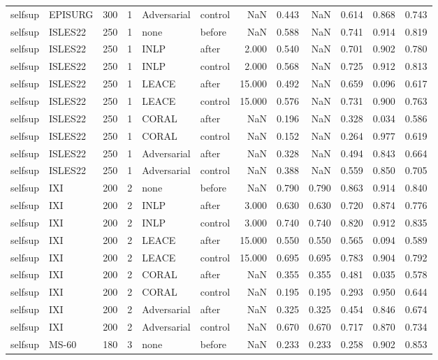 \begin{tabular}{llrrllrrrrrr}
selfsup & EPISURG & 300 & 1 & Adversarial & control & NaN & 0.443 & NaN & 0.614 & 0.868 & 0.743 \\
selfsup & ISLES22 & 250 & 1 & none & before & NaN & 0.588 & NaN & 0.741 & 0.914 & 0.819 \\
selfsup & ISLES22 & 250 & 1 & INLP & after & 2.000 & 0.540 & NaN & 0.701 & 0.902 & 0.780 \\
selfsup & ISLES22 & 250 & 1 & INLP & control & 2.000 & 0.568 & NaN & 0.725 & 0.912 & 0.813 \\
selfsup & ISLES22 & 250 & 1 & LEACE & after & 15.000 & 0.492 & NaN & 0.659 & 0.096 & 0.617 \\
selfsup & ISLES22 & 250 & 1 & LEACE & control & 15.000 & 0.576 & NaN & 0.731 & 0.900 & 0.763 \\
selfsup & ISLES22 & 250 & 1 & CORAL & after & NaN & 0.196 & NaN & 0.328 & 0.034 & 0.586 \\
selfsup & ISLES22 & 250 & 1 & CORAL & control & NaN & 0.152 & NaN & 0.264 & 0.977 & 0.619 \\
selfsup & ISLES22 & 250 & 1 & Adversarial & after & NaN & 0.328 & NaN & 0.494 & 0.843 & 0.664 \\
selfsup & ISLES22 & 250 & 1 & Adversarial & control & NaN & 0.388 & NaN & 0.559 & 0.850 & 0.705 \\
selfsup & IXI & 200 & 2 & none & before & NaN & 0.790 & 0.790 & 0.863 & 0.914 & 0.840 \\
selfsup & IXI & 200 & 2 & INLP & after & 3.000 & 0.630 & 0.630 & 0.720 & 0.874 & 0.776 \\
selfsup & IXI & 200 & 2 & INLP & control & 3.000 & 0.740 & 0.740 & 0.820 & 0.912 & 0.835 \\
selfsup & IXI & 200 & 2 & LEACE & after & 15.000 & 0.550 & 0.550 & 0.565 & 0.094 & 0.589 \\
selfsup & IXI & 200 & 2 & LEACE & control & 15.000 & 0.695 & 0.695 & 0.783 & 0.904 & 0.792 \\
selfsup & IXI & 200 & 2 & CORAL & after & NaN & 0.355 & 0.355 & 0.481 & 0.035 & 0.578 \\
selfsup & IXI & 200 & 2 & CORAL & control & NaN & 0.195 & 0.195 & 0.293 & 0.950 & 0.644 \\
selfsup & IXI & 200 & 2 & Adversarial & after & NaN & 0.325 & 0.325 & 0.454 & 0.846 & 0.674 \\
selfsup & IXI & 200 & 2 & Adversarial & control & NaN & 0.670 & 0.670 & 0.717 & 0.870 & 0.734 \\
selfsup & MS-60 & 180 & 3 & none & before & NaN & 0.233 & 0.233 & 0.258 & 0.902 & 0.853 \\

\end{tabular}
